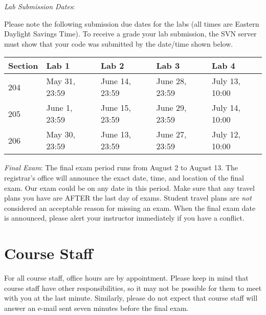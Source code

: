 \documentclass[letterpaper,10pt]{article}
\begin{document}
\textit{Lab Submission Dates}:

Please note the following submission due dates for the labs (all times are Eastern Daylight Savings Time). To receive a grade your lab submission, the SVN server must show that your code was submitted by the date/time shown below. \\

\begin{table}[H]
        \begin{center}
        \begin{tabular}{l|l|l|l|l}
        	\textbf{Section} & \textbf{Lab 1} & \textbf{Lab 2} & \textbf{Lab 3} & \textbf{Lab 4} \\
			\hline
			204 & May 31, 23:59 & June 14, 23:59 & June 28, 23:59 & July 13, 10:00 \\
			\hline
			205 & June 1, 23:59 & June 15, 23:59 & June 29, 23:59 & July 14, 10:00 \\
			\hline
			206 & May 30, 23:59 & June 13, 23:59 & June 27, 23:59 & July 12, 10:00 \\
        \end{tabular}
        \end{center}
\end{table}

\textit{Final Exam}: The final exam period runs from August 2 to August 13. The registrar's office will announce the exact date, time, and location of the final exam. Our exam could be on any date in this period. Make sure that any travel plans you have are AFTER the last day of exams. Student travel plans are \emph{not} considered an acceptable reason for missing an exam. When the final exam date is announced, please alert your instructor immediately if you have a conflict.

\section*{Course Staff}

For all course staff, office hours are by appointment. Please keep in mind that course staff have other responsibilities, so it may not be possible for them to meet with you at the last minute. Similarly, please do not expect that course staff will answer an e-mail sent seven minutes before the final exam.
\end{document}
